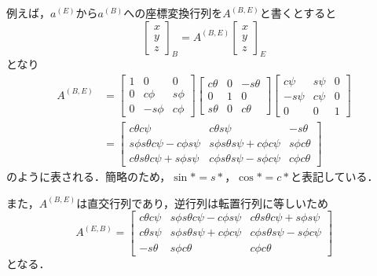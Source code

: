 例えば，$a^{(E)}$から$a^{(B)}$への座標変換行列を$A^{(B,E)}$と書くとすると
\begin{equation}
  \left[
    \begin{array}{ccc}
      x \\
      y \\
      z
    \end{array}
  \right]_B =
  A^{(B,E)}
  \left[
    \begin{array}{ccc}
      x \\
      y \\
      z
    \end{array}
  \right]_E
\end{equation}
となり
\begin{equation}
  \begin{split}
    A^{(B,E)} &=
    \left[
      \begin{array}{ccc}
        1 & 0 & 0 \\
        0 & c\phi & s\phi \\
        0 & -s\phi & c\phi
      \end{array}
    \right]
    \left[
      \begin{array}{ccc}
        c\theta & 0 & -s\theta \\
        0 & 1 & 0 \\
        s\theta & 0 & c\theta
      \end{array}
    \right]
    \left[
      \begin{array}{ccc}
        c\psi & s\psi & 0 \\
        -s\psi & c\psi & 0 \\
        0 & 0 & 1
      \end{array}
    \right] \\
    &=
    \left[
  	\begin{array}{ccc}
    	c\theta c\psi & c\theta s\psi & -s\theta \\
    	s\phi s\theta c\psi - c\phi s\psi & s\phi s\theta s\psi + c\phi c\psi & s\phi c\theta \\
    	c\theta s\theta c\psi + s\phi s\psi & c\phi s\theta s\psi - s\phi c\psi & c\phi c\theta
  	\end{array}
  	\right]
  \end{split}
\end{equation}
のように表される．簡略のため，$\sin* = s*$，$\cos* = c*$と表記している．

また，$A^{(B,E)}$は直交行列であり，逆行列は転置行列に等しいため
\begin{equation}
  A^{(E,B)} =
  \left[
  \begin{array}{ccc}
    c\theta c\psi & s\phi s\theta c\psi - c\phi s\psi & c\theta s\theta c\psi + s\phi s\psi \\
    c\theta s\psi & s\phi s\theta s\psi + c\phi c\psi & c\phi s\theta s\psi - s\phi c\psi \\
    -s\theta & s\phi c\theta & c\phi c\theta
  \end{array}
  \right]
\end{equation}
となる．

